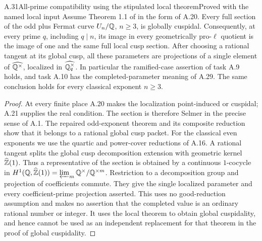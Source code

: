 \begin{statement}{A.31}{All-prime compatibility using the stipulated local theorem}{Proved with the named local input}
Assume Theorem 1.1 of \citet{OpenAILocal2026} in the form of A.20. Every full section of the odd plus Fermat curve $U_n/\mathbb Q$, $n\ge3$, is globally cuspidal. Consequently, at every prime $q$, including $q\mid n$, its image in every geometrically pro-$\ell$ quotient is the image of one and the same full local cusp section. After choosing a rational tangent at its global cusp, all these parameters are projections of a single element of $\widehat{\mathbb Q^\times}$, localized in $\widehat{\mathbb Q_q^\times}$. In particular the ramified-case assertion of task A.9 holds, and task A.10 has the completed-parameter meaning of A.29. The same conclusion holds for every classical exponent $n\ge3$.
\end{statement}
\begin{proof}
At every finite place A.20 makes the localization point-induced or cuspidal; A.21 supplies the real condition. The section is therefore Selmer in the precise sense of A.1. The repaired odd-exponent theorem and its composite reduction show that it belongs to a rational global cusp packet. For the classical even exponents we use the quartic and power-cover reductions of A.16. A rational tangent splits the global cusp decomposition extension with geometric kernel $\widehat{\mathbb Z}(1)$. Thus a representative of the section is obtained by a continuous $1$-cocycle in $H^1(\mathbb Q,\widehat{\mathbb Z}(1))=\varprojlim_m\mathbb Q^\times/\mathbb Q^{\times m}$. Restriction to a decomposition group and projection of coefficients commute. They give the single localized parameter and every coefficient-prime projection asserted. This uses no good-reduction assumption and makes no assertion that the completed value is an ordinary rational number or integer. It uses the local theorem to obtain global cuspidality, and hence cannot be used as an independent replacement for that theorem in the proof of global cuspidality.
\end{proof}

